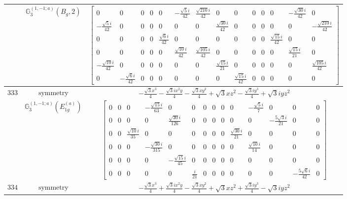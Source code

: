 \documentclass[fleqn,8pt,landscape]{jsarticle}
\begin{document}
\begin{longtable}{ccc}
$  $ & $ \mathbb{G}_{3}^{(1,-1;a)}(B_{g},2) $ & $ \begin{bmatrix} 0 & 0 & 0 & 0 & 0 & - \frac{\sqrt{5} i}{42} & \frac{\sqrt{210} i}{42} & 0 & 0 & 0 & 0 & 0 & - \frac{\sqrt{30} i}{42} & 0 \\ - \frac{\sqrt{5} i}{42} & 0 & 0 & 0 & 0 & 0 & 0 & \frac{\sqrt{30} i}{42} & 0 & 0 & 0 & 0 & 0 & - \frac{\sqrt{210} i}{42} \\ 0 & 0 & 0 & 0 & \frac{\sqrt{6} i}{42} & 0 & 0 & 0 & 0 & 0 & 0 & \frac{\sqrt{15} i}{42} & 0 & 0 \\ 0 & 0 & 0 & 0 & 0 & \frac{\sqrt{10} i}{42} & \frac{\sqrt{105} i}{42} & 0 & 0 & 0 & 0 & 0 & \frac{\sqrt{15} i}{21} & 0 \\ - \frac{\sqrt{10} i}{42} & 0 & 0 & 0 & 0 & 0 & 0 & \frac{\sqrt{15} i}{21} & 0 & 0 & 0 & 0 & 0 & \frac{\sqrt{105} i}{42} \\ 0 & - \frac{\sqrt{6} i}{42} & 0 & 0 & 0 & 0 & 0 & 0 & \frac{\sqrt{15} i}{42} & 0 & 0 & 0 & 0 & 0 \end{bmatrix} $ \\ \hline
$ 333 $ & $ \text{symmetry} $ & $ - \frac{\sqrt{3} x^{3}}{4} - \frac{\sqrt{3} i x^{2} y}{4} - \frac{\sqrt{3} x y^{2}}{4} + \sqrt{3} x z^{2} - \frac{\sqrt{3} i y^{3}}{4} + \sqrt{3} i y z^{2} $ \\
$  $ & $ \mathbb{G}_{3}^{(1,-1;a)}(E_{1g}^{(a)}) $ & $ \begin{bmatrix} 0 & 0 & 0 & - \frac{\sqrt{15} i}{63} & 0 & 0 & 0 & 0 & 0 & 0 & - \frac{\sqrt{5} i}{7} & 0 & 0 & 0 \\ 0 & 0 & 0 & 0 & \frac{\sqrt{30} i}{126} & 0 & 0 & 0 & 0 & 0 & 0 & - \frac{5 \sqrt{3} i}{21} & 0 & 0 \\ 0 & 0 & \frac{\sqrt{10} i}{35} & 0 & 0 & 0 & 0 & 0 & 0 & \frac{\sqrt{30} i}{21} & 0 & 0 & 0 & 0 \\ 0 & 0 & 0 & - \frac{\sqrt{30} i}{315} & 0 & 0 & 0 & 0 & 0 & 0 & \frac{\sqrt{10} i}{14} & 0 & 0 & 0 \\ 0 & 0 & 0 & 0 & - \frac{\sqrt{15} i}{45} & 0 & 0 & 0 & 0 & 0 & 0 & 0 & 0 & 0 \\ 0 & 0 & 0 & 0 & 0 & \frac{i}{21} & 0 & 0 & 0 & 0 & 0 & 0 & - \frac{5 \sqrt{6} i}{42} & 0 \end{bmatrix} $ \\ \hline
$ 334 $ & $ \text{symmetry} $ & $ - \frac{\sqrt{3} x^{3}}{4} + \frac{\sqrt{3} i x^{2} y}{4} - \frac{\sqrt{3} x y^{2}}{4} + \sqrt{3} x z^{2} + \frac{\sqrt{3} i y^{3}}{4} - \sqrt{3} i y z^{2} $ \\

\end{longtable}
\end{document}
